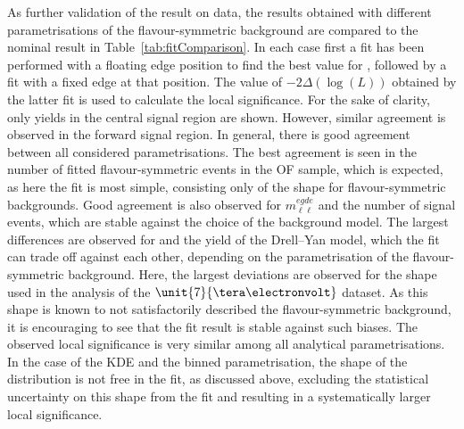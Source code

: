 As further validation of the result on data, the results obtained with different parametrisations of the flavour-symmetric background are compared to the nominal result in Table~\ref{tab:fitComparison}. In each case first a fit has been performed with a floating edge position to find the best value for \mlledge, followed by a fit with a fixed edge at that position. The value of  $-2\Delta\left(\log\left(L\right)\right)$ obtained by the latter fit is used to calculate the local significance. For the sake of clarity, only yields in the central signal region are shown. However, similar agreement is observed in the forward signal region. In general, there is good agreement between all considered parametrisations. The best agreement is seen in the number of fitted flavour-symmetric events in the OF sample, which is expected, as here the fit is most simple, consisting only of the shape for flavour-symmetric backgrounds. Good agreement is also observed for $m_{\ell\ell}^{egde}$ and the number of signal events, which are stable against the choice of the background model. The largest differences are observed for \Rsfof and the yield of the Drell--Yan model, which the fit can trade off against each other, depending on the parametrisation of the flavour-symmetric background. Here, the largest deviations are observed for the shape used in the analysis of the $\unit{7}{\tera\electronvolt}$ dataset. As this shape is known to not satisfactorily described the flavour-symmetric background, it is encouraging to see that the fit result is stable against such biases. The observed local significance is very similar among all analytical parametrisations. In the case of the KDE and the binned parametrisation, the shape of the distribution is not free in the fit, as discussed above, excluding the statistical uncertainty on this shape from the fit and resulting in a systematically larger local significance. 




